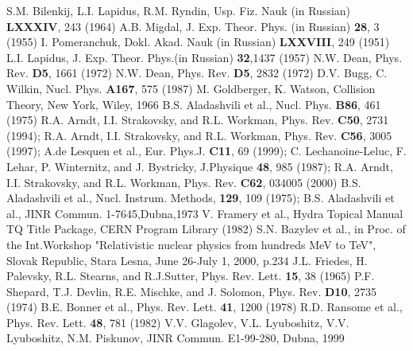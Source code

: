 \documentclass[epj]{svjour}
\begin{document}
\begin{thebibliography}{99}
 S.M. Bilenkij, L.I. Lapidus, R.M. Ryndin, Usp. Fiz. Nauk (in
  Russian) {\bf LXXXIV}, 243 (1964)
 A.B. Migdal, J. Exp. Theor. Phys. (in Russian) {\bf 28}, 3 (1955)
 I. Pomeranchuk, Dokl. Akad. Nauk (in Russian) {\bf LXXVIII}, 249
  (1951)
 L.I. Lapidus, J. Exp. Theor. Phys.(in Russian) {\bf 32},1437
  (1957)
 N.W. Dean, Phys. Rev. {\bf D5}, 1661 (1972)
 N.W. Dean, Phys. Rev. {\bf D5}, 2832 (1972)
 D.V. Bugg, C. Wilkin, Nucl. Phys. {\bf A167}, 575 (1987)
 M. Goldberger, K. Watson, Collision Theory, New York, Wiley, 1966
 B.S. Aladashvili et al., Nucl. Phys. {\bf B86}, 461 (1975)
 R.A. Arndt, I.I. Strakovsky, and R.L. Workman, Phys. Rev. {\bf
    C50}, 2731 (1994); R.A. Arndt, I.I. Strakovsky, and R.L. Workman,
  Phys. Rev. {\bf C56}, 3005 (1997); A.de Lesquen et al., Eur. Phys.J. {\bf
    C11}, 69 (1999); C. Lechanoine-Leluc, F. Lehar, P. Winternitz, and
  J. Bystricky, J.Physique {\bf 48}, 985 (1987); R.A. Arndt, I.I. Strakovsky,
  and R.L. Workman, Phys. Rev. {\bf C62}, 034005 (2000)
 B.S. Aladashvili et al., Nucl. Instrum. Methods, {\bf 129}, 109
  (1975); B.S. Aladashvili et al., JINR Commun. 1-7645,Dubna,1973
 V. Framery et al., Hydra Topical Manual TQ Title Package, CERN
  Program Library (1982)
 S.N. Bazylev et al., in Proc. of the Int.Workshop "Relativistic
  nuclear physics from hundreds MeV to TeV", Slovak Republic, Stara Lesna, June
  26-July 1, 2000, p.234
 J.L. Friedes, H. Palevsky, R.L. Stearns, and R.J.Sutter,
  Phys. Rev. Lett. {\bf 15}, 38 (1965)
 P.F. Shepard, T.J. Devlin, R.E. Mischke, and J. Solomon,
  Phys. Rev. {\bf D10}, 2735 (1974)
 B.E. Bonner et al., Phys. Rev. Lett. {\bf 41}, 1200 (1978)
 R.D. Ransome et al., Phys. Rev. Lett. {\bf 48}, 781 (1982)
 V.V. Glagolev, V.L. Lyuboshitz, V.V. Lyuboshitz, N.M. Piskunov,
  JINR Commun. E1-99-280, Dubna, 1999
\end{thebibliography}
\end{document}
